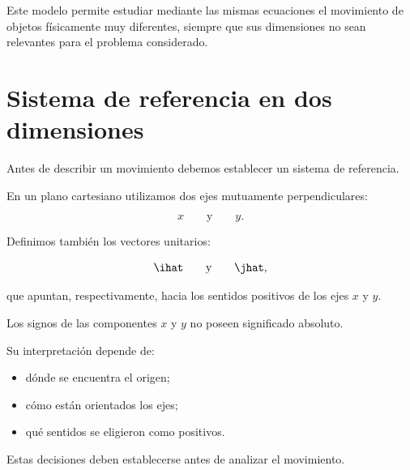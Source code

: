 Este modelo permite estudiar mediante las mismas ecuaciones el movimiento de
objetos físicamente muy diferentes, siempre que sus dimensiones no sean
relevantes para el problema considerado.


\section{Sistema de referencia en dos dimensiones}

Antes de describir un movimiento debemos establecer un sistema de referencia.

En un plano cartesiano utilizamos dos ejes mutuamente perpendiculares:

\[
x
\qquad\text{y}\qquad
y.
\]

Definimos también los vectores unitarios:

\[
\ihat
\qquad\text{y}\qquad
\jhat,
\]

que apuntan, respectivamente, hacia los sentidos positivos de los ejes \(x\) y
\(y\).

\begin{center}
\end{center}

\begin{advertencia}
Los signos de las componentes \(x\) y \(y\) no poseen significado absoluto.

Su interpretación depende de:

\begin{itemize}
    \item dónde se encuentra el origen;
    \item cómo están orientados los ejes;
    \item qué sentidos se eligieron como positivos.
\end{itemize}

Estas decisiones deben establecerse antes de analizar el movimiento.
\end{advertencia}


